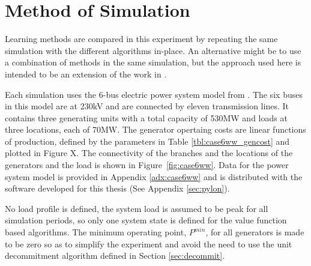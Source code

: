 \section{Method of Simulation}
Learning methods are compared in this experiment by repeating the same
simulation with the different algorithms in-place.  An alternative
might be to use a combination of methods in the same simulation, but the
approach used here is intended to be an extension of the work in
.

Each simulation uses the 6-bus electric power system model from .  The six buses in this model are at 230kV
and are connected by eleven transmission lines.  It contains three generating
units with a total capacity of 530MW and loads at three locations, each of
70MW. The generator opertaing costs are linear functions of production, defined by
the parameters in Table \ref{tbl:case6ww_gencost} and plotted in Figure X.
The connectivity of the branches and the locations of the generators and the
load is shown in Figure~\ref{fig:case6ww}.  Data for the power system model is
provided in Appendix \ref{adx:case6ww} and is distributed with the software
developed for this thesis (See Appendix \ref{sec:pylon}).

%

No load profile is defined, the system load is assumed to be peak for all
simulation periods, so only one system state is defined for the value function
based algorithms.  The minimum operating point, $P^{min}$, for all generators
is made to be zero so as to simplify the experiment and avoid the need to
use the unit decommitment algorithm defined in Section \ref{sec:decommit}.

